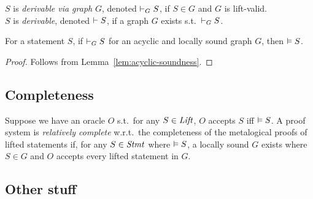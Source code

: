 \iffalse
\begin{lemma}
    Consider a graph $G=(\DomNode,\MapConc,\MapRule,\MapPrems)$,
    and a node $\node \in \DomNode$.
    If the subgraph of $G$ w.r.t.\ $\node$ is acyclic and valid,
    and all rules in the image of $\MapRule$ are locally sound,
    then $\VAL \MapConc(\node)$.
\end{lemma}
\fi

\newcommand{\DERby}[2]{\DER_{#1}{#2}}

\begin{definition}
    $S$ is \emph{derivable via graph} $G$, denoted $\DERby G S$,
    if $S \in G$ and $G$ is lift-valid.\\
    $S$ is \emph{derivable}, denoted $\vdash S$,
    if a graph $G$ exists s.t.\ $\DERby G S$.
\end{definition}

\begin{theorem}
    For a statement $S$,
    if $\DERby G S$ for an acyclic and locally sound graph $G$, %
    then $\vDash S$.
\end{theorem}

\begin{proof}
    Follows from Lemma~\ref{lem:acyclic-soundness}.
\end{proof}


\subsection{Completeness}

\begin{definition}
    Suppose we have an oracle $O$ s.t.\
    for any $S \in \mathit{Lift}$,
    $O$ accepts $S$ iff $\vDash S$.
    A proof system is \emph{relatively complete} w.r.t.\
    the completeness of the metalogical proofs of lifted statements
    if, for any $S \in \mathit{Stmt}$ where $\vDash S$,
    a locally sound $G$ exists where $S \in G$
    and $O$ accepts every lifted statement in $G$.
\end{definition}

\subsection{Other stuff}

